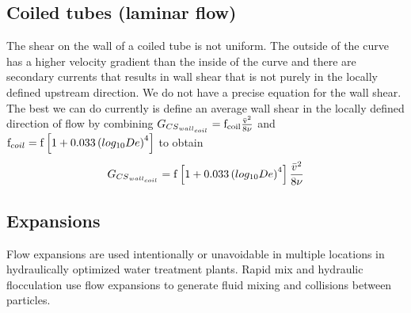 \documentclass[letterpaper,10pt,english]{sphinxmanual}
\begin{document}
\subsection{Coiled tubes (laminar flow)}
\label{\detokenize{Rapid_Mix/RM_Derivations:heading-coiled-tubes-laminar-flow-1}}\label{\detokenize{Rapid_Mix/RM_Derivations:id1}}
The shear on the wall of a coiled tube is not uniform. The outside of the curve has a higher velocity gradient than the inside of the curve and there are secondary currents that results in wall shear that is not purely in the locally defined upstream direction. We do not have a precise equation for the wall shear. The best we can do currently is define an average wall shear in the locally defined direction of flow by combining
\(G_{{CS}_{wall_{coil}}} =\rm{f_{coil}} \frac{\bar v^2}{8\nu}\) and
\({\rm f}_{coil} = {\rm f} \left[ 1 + 0.033\left(log_{10}De\right)^4 \right]\)
to obtain
\begin{equation}\label{equation:Rapid_Mix/RM_Derivations:Rapid_Mix/RM_Derivations:114}
\begin{split}G_{{CS}_{wall_{coil}}} ={\rm f} \left[ 1 + 0.033 \left(log_{10}De \right)^4 \right]  \frac{\bar v^2}{8\nu}\end{split}
\end{equation}

\subsection{Expansions}
\label{\detokenize{Rapid_Mix/RM_Derivations:heading-expansions-1}}\label{\detokenize{Rapid_Mix/RM_Derivations:id2}}
Flow expansions are used intentionally or unavoidable in multiple locations in hydraulically optimized water treatment plants. Rapid mix and hydraulic flocculation use flow expansions to generate fluid mixing and collisions between particles.
\end{document}
